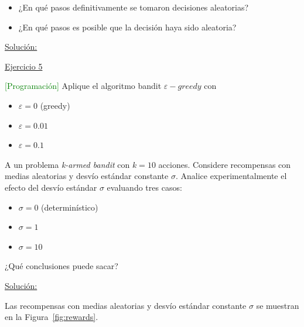 \documentclass[12pt]{article}
\newlength\tindent
\renewcommand{\indent}{\hspace*{\tindent}}
\begin{document}
    \begin{itemize}
        \item ¿En qué pasos definitivamente se tomaron decisiones aleatorias?
        \item ¿En qué pasos es posible que la decisión haya sido aleatoria?
    \end{itemize}

    \indent\underline{Solución:}

    \lipsum[4]


    \indent\underline{Ejercicio 5}

    \textcolor{green}{[Programación]} Aplique el algoritmo bandit $\varepsilon-greedy$ con
    \begin{itemize}
        \item $\varepsilon=0$ (greedy)
        \item $\varepsilon=0.01$
        \item $\varepsilon=0.1$
    \end{itemize}

    A un problema \textit{k-armed bandit} con $k=10$ acciones.
    Considere recompensas con medias aleatorias y desvío estándar constante $\sigma$.
    Analice experimentalmente el efecto del desvío estándar $\sigma$ evaluando tres casos:
    \begin{itemize}
        \item $\sigma=0$ (determinístico)
        \item $\sigma=1$
        \item $\sigma=10$
    \end{itemize}

    ¿Qué conclusiones puede sacar?

    \indent\underline{Solución:}

    Las recompensas con medias aleatorias y desvío estándar constante $\sigma$ se muestran en la Figura~\ref{fig:rewards}.
\end{document}
